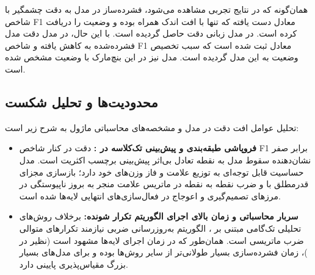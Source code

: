 همان‌گونه که در نتایج تجربی مشاهده می‌شود، فشرده‌ساز  در مدل  به دقت چشمگیر  با شاخص F1 معادل  دست یافته که تنها با افت اندک  همراه بوده و وضعیت  را دریافت کرده است. در مدل زبانی  دقت  حاصل گردیده است. با این حال، در مدل  دقت مدل فشرده‌شده به  کاهش یافته و شاخص F1 معادل  ثبت شده است که سبب تخصیص وضعیت  به این مدل گردیده است. مدل  نیز در این بنچ‌مارک با وضعیت  مشخص شده است.

\subsection{محدودیت‌ها و تحلیل شکست}
تحلیل عوامل افت دقت در مدل  و مشخصه‌های محاسباتی ماژول  به شرح زیر است:
\begin{itemize}
    \item \textbf{فروپاشی طبقه‌بندی و پیش‌بینی تک‌کلاسه در :} دقت  در کنار شاخص F1 برابر صفر نشان‌دهنده سقوط مدل به نقطه تعادل بی‌اثر پیش‌بینی برچسب اکثریت است. مدل  حساسیت قابل توجه‌ای به توزیع علامت و فاز وزن‌های خود دارد؛ بازسازی مجزای قدرمطلق با  و ضرب نقطه به نقطه در ماتریس علامت منجر به بروز ناپیوستگی در مرزهای تصمیم‌گیری و اعوجاج در فعال‌سازی‌های انتهایی لایه‌ها شده است.
    \item \textbf{سربار محاسباتی و زمان بالای اجرای الگوریتم تکرار شونده:} برخلاف روش‌های تحلیلی تک‌گامی مبتنی بر ، الگوریتم به‌روزرسانی ضربی  نیازمند تکرارهای متوالی ضرب ماتریسی است. همان‌طور که در زمان اجرای لایه‌ها مشهود است (نظیر  در )، زمان فشرده‌سازی بسیار طولانی‌تر از سایر روش‌ها بوده و برای مدل‌های بسیار بزرگ مقیاس‌پذیری پایینی دارد.
\end{itemize}
